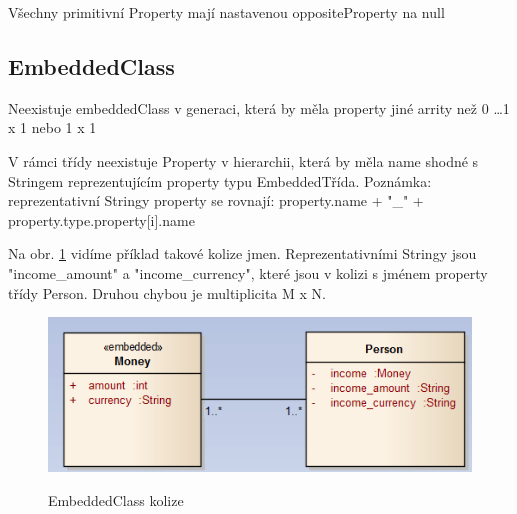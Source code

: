\documentclass{article}
\begin{document}
Všechny primitivní Property mají nastavenou oppositeProperty na null 

\subsection{EmbeddedClass}
Neexistuje embeddedClass v generaci, která by měla property jiné arrity než
0 \ldots 1 x 1 nebo 1 x 1 \newline

V rámci třídy neexistuje Property v hierarchii, která by měla name shodné s
Stringem reprezentujícím property typu EmbeddedTřída. Poznámka: reprezentativní
Stringy property se rovnají:\newline
 property.name + "\_" + property.type.property[i].name \newline

Na obr. \ref{pict:embedded-collision} vidíme příklad takové kolize jmen.
Reprezentativními Stringy jsou "income\_amount" a "income\_currency", které jsou
v kolizi s jménem property třídy Person. Druhou chybou je multiplicita M x N.
\begin{figure}[t]
	\begin{center}
	\label{pict:embedded-collision}		             
    \includegraphics[scale=1.0]{../images/embedded_collision_example.png}
	\caption{EmbeddedClass kolize}
	\end{center}			     
\end{figure}
\end{document}
